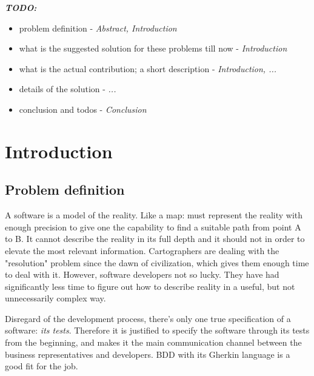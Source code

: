 \documentclass[conference]{IEEEtran}
\begin{document}


%
\IEEEpeerreviewmaketitle

\textbf{\textit{TODO:}}
\begin{itemize}
    \item problem definition - \textit{Abstract, Introduction}
    \item what is the suggested solution for these problems till now - \textit{Introduction}
    \item what is the actual contribution; a short description - \textit{Introduction, ...}
    \item details of the solution - \textit{...}
    \item conclusion and todos - \textit{Conclusion}
\end{itemize}

\section{Introduction}
\subsection{Problem definition}


A software is a model of the reality. Like a map: must represent the reality with enough precision to give one the capability to find a suitable path from point A to B. It cannot describe the reality in its full depth and it should not in order to elevate the most relevant information. Cartographers are dealing with the "resolution" problem since the dawn of civilization, which gives them enough time to deal with it. However, software developers not so lucky. They have had significantly less time to figure out how to describe reality in a useful, but not unnecessarily complex way.

Disregard of the development process, there's only one true specification of a software: \textit{its tests}. Therefore it is justified to specify the software through its tests from the beginning, and makes it the main communication channel between the business representatives and developers. BDD with its Gherkin language is a good fit for the job.
\end{document}

